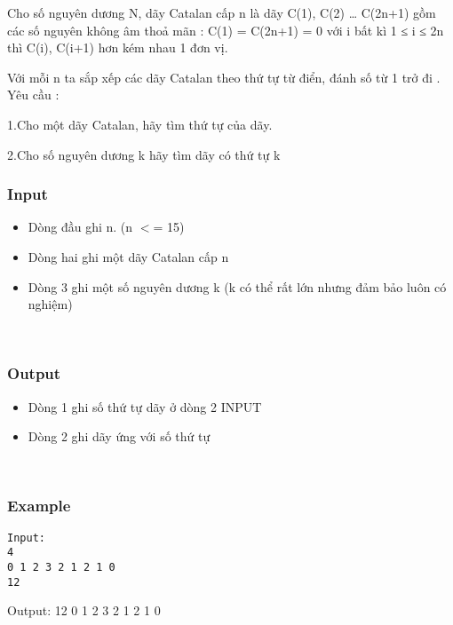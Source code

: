 

Cho số nguyên dương N, dãy Catalan cấp n là dãy C(1), C(2) … C(2n+1) gồm các số nguyên không âm thoả mãn : C(1) = C(2n+1) = 0 với i bất kì 1 ≤ i ≤ 2n thì C(i), C(i+1) hơn kém nhau 1 đơn vị.

Với mỗi n ta sắp xếp các dãy Catalan theo thứ tự từ điển, đánh số từ 1 trở đi . Yêu cầu :

1.Cho một dãy Catalan, hãy tìm thứ tự của dãy.

2.Cho số nguyên dương k hãy tìm dãy có thứ tự k

\subsubsection{Input}
\begin{itemize}
	\item Dòng đầu ghi n. (n $<$= 15)
	\item Dòng hai ghi một dãy Catalan cấp n
	\item Dòng 3 ghi một số nguyên dương k (k có thể rất lớn nhưng đảm bảo luôn có nghiệm)
\end{itemize}

 

\subsubsection{Output}
\begin{itemize}
	\item Dòng 1 ghi số thứ tự dãy ở dòng 2 INPUT
	\item Dòng 2 ghi dãy ứng với số thứ tự
\end{itemize}

 

\subsubsection{Example}
\begin{verbatim}
Input:
4
0 1 2 3 2 1 2 1 0
12\end{verbatim}

Output: 12 0 1 2 3 2 1 2 1 0